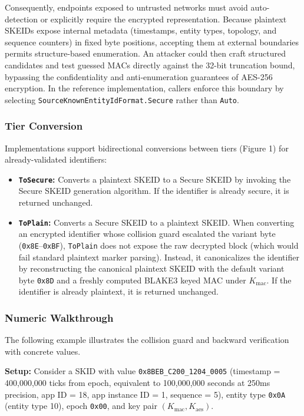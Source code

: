 \documentclass[fleqn,10pt,lineno]{wlpeerj}
\providecommand{\tightlist}{%
  \setlength{\itemsep}{0pt}\setlength{\parskip}{0pt}}
\begin{document}
Consequently, endpoints exposed to untrusted networks must avoid
auto-detection or explicitly require the encrypted representation.
Because plaintext SKEIDs expose internal metadata (timestamps, entity
types, topology, and sequence counters) in fixed byte positions,
accepting them at external boundaries permits structure-based
enumeration. An attacker could then craft structured candidates and test
guessed MACs directly against the 32-bit truncation bound, bypassing the
confidentiality and anti-enumeration guarantees of AES-256 encryption.
In the reference implementation, callers enforce this boundary by
selecting \texttt{SourceKnownEntityIdFormat.Secure} rather than
\texttt{Auto}.

\subsubsection{Tier Conversion}\label{tier-conversion}

Implementations support bidirectional conversions between tiers (Figure
1) for already-validated identifiers:

\begin{itemize}
\tightlist
\item
  \textbf{\texttt{ToSecure}:} Converts a plaintext SKEID to a Secure
  SKEID by invoking the Secure SKEID generation algorithm. If the
  identifier is already secure, it is returned unchanged.
\item
  \textbf{\texttt{ToPlain}:} Converts a Secure SKEID to a plaintext
  SKEID. When converting an encrypted identifier whose collision guard
  escalated the variant byte (\texttt{0x8E}--\texttt{0xBF}),
  \texttt{ToPlain} does not expose the raw decrypted block (which would
  fail standard plaintext marker parsing). Instead, it canonicalizes the
  identifier by reconstructing the canonical plaintext SKEID with the
  default variant byte \texttt{0x8D} and a freshly computed BLAKE3 keyed
  MAC under \(K_{\mathrm{mac}}\). If the identifier is already
  plaintext, it is returned unchanged.
\end{itemize}

\subsubsection{Numeric Walkthrough}\label{numeric-walkthrough}

The following example illustrates the collision guard and backward
verification with concrete values.

\textbf{Setup:} Consider a SKID with value
\texttt{0x8BEB\_C200\_1204\_0005} (timestamp = 400,000,000 ticks from
epoch, equivalent to 100,000,000 seconds at 250ms precision, app ID =
18, app instance ID = 1, sequence = 5), entity type \texttt{0x0A}
(entity type 10), epoch \texttt{0x00}, and key pair
\((K_{\mathrm{mac}}, K_{\mathrm{aes}})\).
\end{document}
